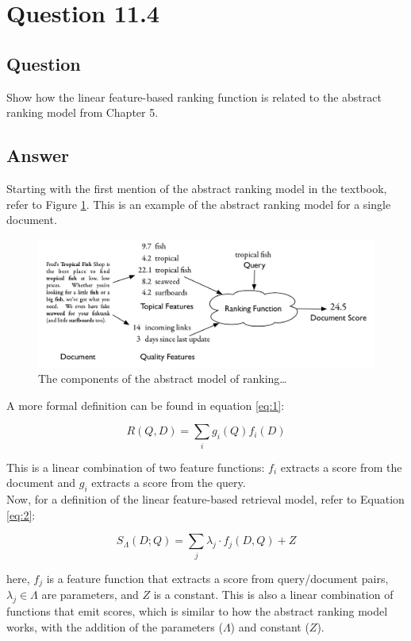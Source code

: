 \section{Question 11.4}

\subsection{Question}
Show how the linear feature-based ranking function is related to the abstract ranking model from Chapter 5.


\subsection{Answer}
Starting with the first mention of the abstract ranking model in the textbook, refer to Figure \ref{fig:51}.  This is an example of the abstract ranking model for a single document.

\begin{figure}[H]
\centering
\label{fig:51}
\includegraphics[scale=.25]{q11.4/fig51.png}
\caption{The components of the abstract model of ranking\dots}
\end{figure}

A more formal definition can be found in equation \ref{eq:1}:

\begin{equation}
\label{eq:1}
R(Q, D) = \sum_i g_i (Q) f_i (D)
\end{equation}

This is a linear combination of two feature functions: \(f_i\) extracts a score from the document and \(g_i\) extracts a score from the query.\\

Now, for a definition of the linear feature-based retrieval model, refer to Equation \ref{eq:2}:

\begin{equation}
\label{eq:2}
S_\Lambda(D;Q) = \sum_j \lambda_j \cdot f_j(D, Q) + Z
\end{equation}

here, \(f_j\) is a feature function that extracts a score from query/document pairs, \(\lambda_j \in \Lambda\) are parameters, and \(Z\) is a constant.  This is also a linear combination of functions that emit scores, which is similar to how the abstract ranking model works, with the addition of the parameters (\(\Lambda\)) and constant (\(Z\)).